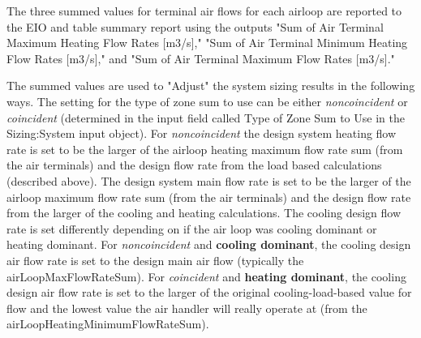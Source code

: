 The three summed values for terminal air flows for each airloop are reported to the EIO and table summary report using the outputs "Sum of Air Terminal Maximum Heating Flow Rates [m3/s]," "Sum of Air Terminal Minimum Heating Flow Rates [m3/s]," and "Sum of Air Terminal Maximum Flow Rates [m3/s]."

 The summed values are used to "Adjust" the system sizing results in the following ways.  The setting for the type of zone sum to use can be either \emph{noncoincident} or \emph{coincident} (determined in the input field called Type of Zone Sum to Use in the Sizing:System input object).  For \emph{noncoincident} the design system heating flow rate is set to be the larger of the airloop heating maximum flow rate sum (from the air terminals) and the design flow rate from the load based calculations (described above).  The design system main flow rate is set to be the larger of the airloop maximum flow rate sum (from the air terminals) and the design flow rate from the larger of the cooling and heating calculations. The cooling design flow rate is set differently depending on if the air loop was cooling dominant or heating dominant.  For \emph{noncoincident} and \textbf{cooling dominant}, the cooling design air flow rate is set to the design main air flow (typically the airLoopMaxFlowRateSum). For \emph{coincident} and \textbf{heating dominant}, the cooling design air flow rate is set to the larger of the original cooling-load-based value for flow and the lowest value the air handler will really operate at (from the airLoopHeatingMinimumFlowRateSum).  
 
